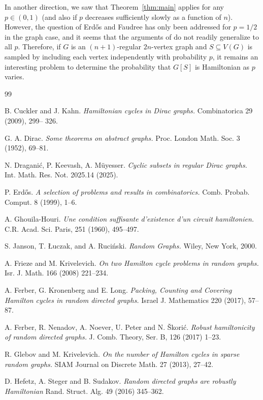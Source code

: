 \documentclass[a4paper,11pt]{article}
\theoremstyle{definition}
\begin{document}
In another direction, we saw that Theorem~\ref{thm:main} applies for any $p\in (0, 1)$ (and also if $p$ decreases sufficiently slowly as a function of $n$). However, the question of Erd\H{o}s and Faudree has only been addressed for $p=1/2$ in the graph case, and it seems that the arguments of \cite{DKM} do not readily generalize to all $p$. Therefore, if $G$ is an $(n+1)$-regular $2n$-vertex graph and $S\subseteq V(G)$ is sampled by including each vertex independently with probability $p$, it remains an interesting problem to determine the probability that $G[S]$ is Hamiltonian as $p$ varies.

\begin{thebibliography}{99}

B. Cuckler and J. Kahn. 
\emph{Hamiltonian cycles in Dirac graphs.} 
Combinatorica 29 (2009), 299--
326.

G. A. Dirac.
\emph{Some theorems on abstract graphs.} 
Proc. London Math. Soc. 3 (1952), 69--81.

N. Dragani\'c, P. Keevash, A. M\"uyesser. 
\emph{Cyclic subsets in regular Dirac graphs.}
Int. Math. Res. Not. 2025.14 (2025).

 P. Erd\H{o}s. 
\emph{A selection of problems and results in combinatorics.} 
Comb. Probab. Comput. 8 (1999), 1--6.

A. Ghouila-Houri. 
\emph{Une condition suffisante d’existence d’un circuit hamiltonien.} 
C.R. Acad. Sci. Paris, 251 (1960), 495--497.

S. Janson, T. \L{}uczak, and A. Ruci\'nski. 
\emph{Random Graphs.} 
Wiley, New York, 2000.

A. Frieze and M. Krivelevich.
\emph{On two Hamilton cycle problems in random graphs.}
Isr. J. Math. 166 (2008) 221--234.

A. Ferber, G. Kronenberg and E. Long.
\emph{Packing, Counting and Covering Hamilton cycles in random directed graphs.}
Israel J. Mathematics 220 (2017), 57–87.

A. Ferber, R. Nenadov, A. Noever, U. Peter and N. \v{S}kori\'c. 
\emph{Robust hamiltonicity of random directed graphs.}
J. Comb. Theory, Ser. B, 126 (2017) 1--23.

R. Glebov and M. Krivelevich.
\emph{On the number of Hamilton cycles in sparse random graphs.}
SIAM Journal on Discrete Math. 27 (2013), 27--42.

D. Hefetz, A. Steger and B. Sudakov.
\emph{Random directed graphs are robustly Hamiltonian}
Rand. Struct. Alg. 49 (2016) 345--362.


\end{thebibliography}
\end{document}
